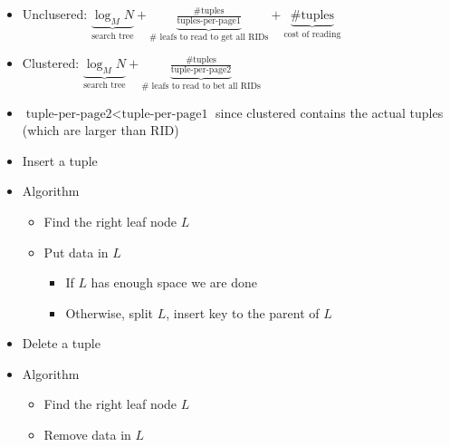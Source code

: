 \begin{itemize}
\begin{itemize}
\begin{itemize}
                        \begin{itemize}
                            \item Unclusered: $\underbrace{\log_M N}_{\text{search tree}} + \underbrace{\frac{\text{\#tuples}}{\text{tuples-per-page1}}}_{\#\text{ leafs to read to get all RIDs}} + \underbrace{\# \text{tuples}}_{\text{cost of reading}}$
                            \item Clustered: $\underbrace{\log_M N}_{\text{search tree}} + \underbrace{\frac{\text{\#tuples}}{\text{tuple-per-page2}}}_{\# \text{ leafs to read to bet all RIDs}}$
                            \item $\text{tuple-per-page2} < \text{tuple-per-page1}$ since clustered contains the actual tuples (which are larger than RID)
                        \end{itemize}
                \end{itemize}
                \begin{itemize}
                    \item Insert a tuple
                    \item Algorithm
                        \begin{itemize}
                            \item Find the right leaf node $L$
                            \item Put data in $L$
                                \begin{itemize}
                                    \item If $L$ has enough space we are done
                                    \item Otherwise, split $L$, insert key to the parent of $L$
                                \end{itemize}
                        \end{itemize}
                \end{itemize}
                \begin{itemize}
                    \item Delete a tuple
                    \item Algorithm
                        \begin{itemize}
                            \item Find the right leaf node $L$
                            \item Remove data in $L$
                                \begin{itemize}

\end{itemize}
\end{itemize}
\end{itemize}
\end{itemize}
\end{itemize}
